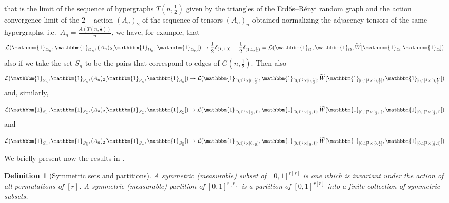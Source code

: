 \documentclass[11pt]{article}
\newtheorem{definition}[theorem]{Definition}
\begin{document}
that is the limit of the sequence of hypergraphs $T(n,\frac{1}{2})$ given by the triangles of the Erdős–Rényi random graph and the action convergence limit of the $2-$action $(A_n)_2$ of the sequence of tensors $(A_n)_n$ obtained normalizing the adjacency tensors of the same hypergraphs, i.e.\ $A_n=\frac{A(T(n,\frac{1}{2}))}{n}$,  we have, for example, that
$$ 
\mathcal{L}(\mathbbm{1}_{\Omega_n},\mathbbm{1}_{\Omega_n},(A_n)_2[\mathbbm{1}_{\Omega_n},\mathbbm{1}_{\Omega_n}])\rightarrow  \frac{1}{2}\delta_{(1,1,0)}+\frac{1}{2}\delta_{(1,1,\frac{1}{4})}=\mathcal{L}(\mathbbm{1}_{\Omega},\mathbbm{1}_{\Omega},\widetilde{W}[\mathbbm{1}_{\Omega},\mathbbm{1}_{\Omega}])
$$ also if we take the set $S_n$ to be the pairs that correspond to edges of $G(n,\frac{1}{2})$. Then also   
$$ \mathcal{L}(\mathbbm{1}_{S_n},\mathbbm{1}_{S_n},(A_n)_2[\mathbbm{1}_{S_n},\mathbbm{1}_{S_n}])\rightarrow  \mathcal{L}(\mathbbm{1}_{[0,1]^2\times [0,\frac{1}{2}]},\mathbbm{1}_{[0,1]^2\times [0,\frac{1}{2}]},\widetilde{W}[\mathbbm{1}_{[0,1]^2\times [0,\frac{1}{2}]},\mathbbm{1}_{[0,1]^2\times [0,\frac{1}{2}]}])
$$
and, similarly,

$$\mathcal{L}(\mathbbm{1}_{S^c_n},\mathbbm{1}_{S^c_n},(A_n)_2[\mathbbm{1}_{S^c_n},\mathbbm{1}_{S^c_n}])\rightarrow \mathcal{L}(\mathbbm{1}_{[0,1]^2\times [\frac{1}{2},1]},\mathbbm{1}_{[0,1]^2\times [\frac{1}{2},1]},\widetilde{W}[\mathbbm{1}_{[0,1]^2\times [\frac{1}{2},1]},\mathbbm{1}_{[0,1]^2\times [\frac{1}{2},1]}])$$
and 

$$\mathcal{L}(\mathbbm{1}_{S_n},\mathbbm{1}_{S^c_n},(A_n)_2[\mathbbm{1}_{S_n},\mathbbm{1}_{S^c_n}])\rightarrow \mathcal{L}(\mathbbm{1}_{[0,1]^2\times [0,\frac{1}{2}]},\mathbbm{1}_{[0,1]^2\times [\frac{1}{2},1]},\widetilde{W}[\mathbbm{1}_{[0,1]^2\times [0,\frac{1}{2}]},\mathbbm{1}_{[0,1]^2\times [\frac{1}{2},1]}])$$

We briefly present now the results in \cite{HypergraphonsZhao}. 

\begin{definition} [Symmetric sets and partitions] A symmetric (measurable) subset of $[0,1]^{r[r]}$ is one which is invariant under the action of all permutations of $[r]$. A symmetric (measurable) partition of $[0,1]^{r[r]}$ is a partition of $[0,1]^{r[r]}$ into a finite collection of symmetric subsets.
\end{definition}
\end{document}
